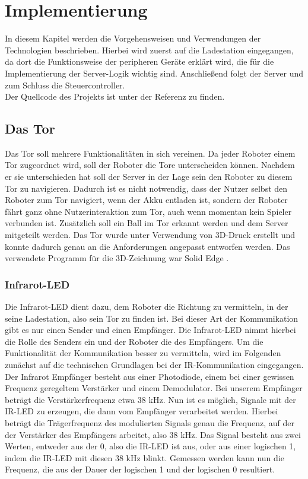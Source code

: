 \chapter{Implementierung}
\label{ch:implementierung}

In diesem Kapitel werden die Vorgehensweisen und Verwendungen der Technologien beschrieben. Hierbei wird zuerst auf die Ladestation eingegangen, da dort die Funktionsweise der peripheren Geräte erklärt wird, die für die Implementierung der Server-Logik wichtig sind. Anschließend folgt der Server und zum Schluss die Steuercontroller. \\
Der Quellcode des Projekts ist unter der Referenz \cite{PROJEKT} zu finden.


\section{Das Tor}
Das Tor soll mehrere Funktionalitäten in sich vereinen. Da jeder Roboter einem Tor zugeordnet wird, soll der Roboter die Tore unterscheiden können. Nachdem er sie unterschieden hat soll der Server in der Lage sein den Roboter zu diesem Tor zu navigieren. Dadurch ist es nicht notwendig, dass der Nutzer selbst den Roboter zum Tor navigiert, wenn der Akku entladen ist, sondern der Roboter fährt ganz ohne Nutzerinteraktion zum Tor, auch wenn momentan kein Spieler verbunden ist. Zusätzlich soll ein Ball im Tor erkannt werden und dem Server mitgeteilt werden. Das Tor wurde unter Verwendung von 3D-Druck erstellt und konnte dadurch genau an die Anforderungen angepasst entworfen werden. Das verwendete Programm für die 3D-Zeichnung war Solid Edge \cite{SOLIDEDGE}.


\subsection{Infrarot-LED}
\label{sec:infrarot_led}
Die Infrarot-LED dient dazu, dem Roboter die Richtung zu vermitteln, in der seine Ladestation, also sein Tor zu finden ist. Bei dieser Art der Kommunikation gibt es nur einen Sender und einen Empfänger. Die Infrarot-LED nimmt hierbei die Rolle des Senders ein und der Roboter die des Empfängers. 
Um die Funktionalität der Kommunikation besser zu vermitteln, wird im Folgenden zunächst auf die technischen Grundlagen bei der IR-Kommunikation eingegangen.
Der Infrarot Empfänger besteht aus einer Photodiode, einem bei einer gewissen Frequenz geregeltem Verstärker und einem Demodulator. Bei unserem Empfänger beträgt die Verstärkerfrequenz etwa 38 kHz. Nun ist es möglich, Signale mit der IR-LED zu erzeugen, die dann vom Empfänger verarbeitet werden. Hierbei beträgt die Trägerfrequenz des modulierten Signals genau die Frequenz, auf der der Verstärker des Empfängers arbeitet, also 38 kHz. Das Signal besteht aus zwei Werten, entweder aus der 0, also die IR-LED ist aus, oder aus einer logischen 1, indem die IR-LED mit diesen 38 kHz blinkt. Gemessen werden kann nun die Frequenz, die aus der Dauer der logischen 1 und der logischen 0 resultiert. 

